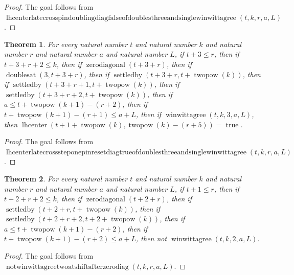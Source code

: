 \documentclass[11pt]{article}
\newtheorem{theorem}{Theorem}[section]
\theoremstyle{definition}
\begin{document}
\begin{proof}
The goal follows from \(\operatorname{lhcenterlatecrosspindoublingdiagfalseofdoublesthreeandsinglewinwittagree}(t, k, r, a, L)\).
\end{proof}
\begin{theorem}
\label{ll:paper:lhcenter-late-cross-step-one-pin-reset-diag-true-of-doubles-three-and-single-winwittagree}
For every natural number \(t\) and natural number \(k\) and natural number \(r\) and natural number \(a\) and natural number \(L\), if \(t + 3 \le r\), then if \(t + 3 + r + 2 \le k\), then if \(\operatorname{zerodiagonal}(t + 3 + r)\), then if \(\operatorname{doublesat}(3, t + 3 + r)\), then if \(\operatorname{settledby}(t + 3 + r, t + \operatorname{twopow}(k))\), then if \(\operatorname{settledby}(t + 3 + r + 1, t + \operatorname{twopow}(k))\), then if \(\operatorname{settledby}(t + 3 + r + 2, t + \operatorname{twopow}(k))\), then if \(a \le t + \operatorname{twopow}(k + 1) - (r + 2)\), then if \(t + \operatorname{twopow}(k + 1) - (r + 1) \le a + L\), then if \(\operatorname{winwittagree}(t, k, 3, a, L)\), then \(\operatorname{lhcenter}(t + 1 + \operatorname{twopow}(k), \operatorname{twopow}(k) - (r + 5)) = \operatorname{true}\).
\end{theorem}
\begin{proof}
The goal follows from \(\operatorname{lhcenterlatecrosssteponepinresetdiagtrueofdoublesthreeandsinglewinwittagree}(t, k, r, a, L)\).
\end{proof}
\begin{theorem}
\label{ll:paper:not-winwittagree-two-at-shift-after-zero-diag}
For every natural number \(t\) and natural number \(k\) and natural number \(r\) and natural number \(a\) and natural number \(L\), if \(t + 1 \le r\), then if \(t + 2 + r + 2 \le k\), then if \(\operatorname{zerodiagonal}(t + 2 + r)\), then if \(\operatorname{settledby}(t + 2 + r, t + \operatorname{twopow}(k))\), then if \(\operatorname{settledby}(t + 2 + r + 2, t + 2 + \operatorname{twopow}(k))\), then if \(a \le t + \operatorname{twopow}(k + 1) - (r + 2)\), then if \(t + \operatorname{twopow}(k + 1) - (r + 2) \le a + L\), then not \(\operatorname{winwittagree}(t, k, 2, a, L)\).
\end{theorem}
\begin{proof}
The goal follows from \(\operatorname{notwinwittagreetwoatshiftafterzerodiag}(t, k, r, a, L)\).
\end{proof}
\end{document}
